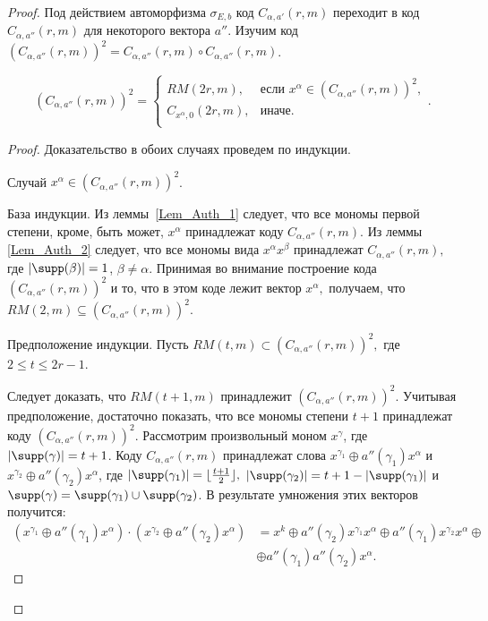 \begin{proof}
	Под действием автоморфизма $\sigma_{E,b}$ код $C_{\alpha,a'}(r,m)$ переходит в код $C_{\alpha,a''}(r,m)$ для некоторого вектора $a''$.
	Изучим код $(C_{\alpha,a''}(r,m))^2 = C_{\alpha,a''}(r,m) \circ C_{\alpha,a''}(r,m)$.
	\begin{lemma}
		\label{Lem_Auth_3}
		\begin{displaymath}
			(C_{\alpha,a''}(r,m))^2 =
			\begin{cases}
				RM(2r,m),               & \text{если } x^{\alpha} \in (C_{\alpha,a''}(r,m))^2, \\
				C_{x^{\alpha},0}(2r,m), & \text{иначе.}                                        \\
			\end{cases}.
		\end{displaymath}
	\end{lemma}
	\begin{proof}
		Доказательство в обоих случаях проведем по индукции.

		Случай $x^{\alpha} \in (C_{\alpha,a''}(r,m))^2$.

		База индукции.
		Из леммы~\ref{Lem_Auth_1} следует, что все мономы первой степени, кроме, быть может, $x^{\alpha}$ принадлежат коду $C_{\alpha,a''}(r,m)$.
		Из леммы \ref{Lem_Auth_2} следует, что все мономы вида $x^{\alpha}x^{\beta}$ принадлежат $C_{\alpha,a''}(r,m),$ где $|\supp(\beta)|=1$, $\beta \not=\alpha$.
		Принимая во внимание построение кода $(C_{\alpha,a''}(r,m))^2$ и то, что в этом коде лежит вектор $x^{\alpha},$ получаем, что $RM(2,m)\subseteq (C_{\alpha,a''}(r,m))^2.$

		Предположение индукции.
		Пусть $RM(t,m)\subset (C_{\alpha,a''}(r,m))^2,$ где $2 \leqslant t \leqslant 2r-1$.

		Следует доказать, что $RM(t+1,m)$ принадлежит $(C_{\alpha,a''}(r,m))^2$.
		Учитывая предположение, достаточно показать, что все мономы степени $t+1$ принадлежат коду $(C_{\alpha,a''}(r,m))^2$.
		Рассмотрим произвольный моном $x^{\gamma}$, где $|\supp(\gamma)| = t+1$.
		Коду $C_{\alpha,a''}(r,m)$ принадлежат слова $x^{\gamma_1} \oplus a''(\gamma_1)x^{\alpha}$ и $x^{\gamma_2} \oplus a''(\gamma_2)x^{\alpha}$, где $|\supp(\gamma_1)| = \lfloor\frac{t+1}{2}\rfloor,$ $|\supp(\gamma_2)| = t + 1 - |\supp(\gamma_1)|$ и $\supp(\gamma) = \supp(\gamma_1) \cup \supp(\gamma_2)$.
		В результате умножения этих векторов получится:
		\begin{equation*}
			\begin{split}
				(x^{\gamma_1} \oplus a''(\gamma_1)x^{\alpha} )\cdot( x^{\gamma_2} \oplus a''(\gamma_2)x^{\alpha} )&= x^k \oplus a''(\gamma_2)x^{\gamma_1}x^{\alpha} \oplus a''(\gamma_1)x^{\gamma_2}x^{\alpha} \oplus\\
				&\oplus a''(\gamma_1)a''(\gamma_2)x^{\alpha}.


\end{split}
\end{equation*}
\end{proof}
\end{proof}
